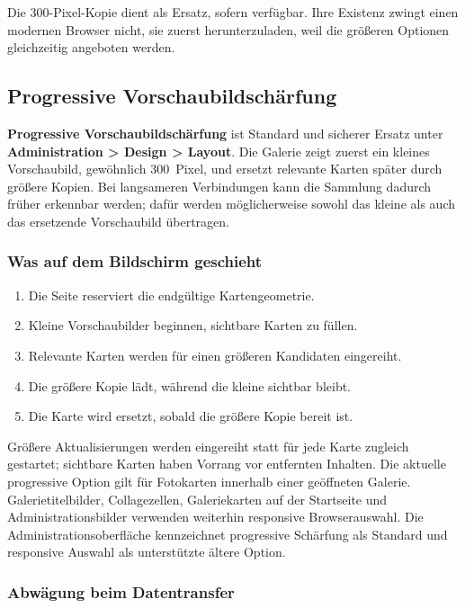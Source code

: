 \documentclass[11pt,a4paper]{article}
\newcommand{\ui}[1]{\textbf{#1}}
\begin{document}
Die 300-Pixel-Kopie dient als Ersatz, sofern verfügbar. Ihre Existenz zwingt
einen modernen Browser nicht, sie zuerst herunterzuladen, weil die größeren
Optionen gleichzeitig angeboten werden.

\subsection{Progressive Vorschaubildschärfung}

\ui{Progressive Vorschaubildschärfung} ist Standard und sicherer Ersatz unter
\ui{Administration > Design > Layout}. Die Galerie zeigt zuerst ein kleines
Vorschaubild, gewöhnlich 300~Pixel, und ersetzt relevante Karten später durch
größere Kopien. Bei langsameren Verbindungen kann die Sammlung dadurch früher
erkennbar werden; dafür werden möglicherweise sowohl das kleine als auch das
ersetzende Vorschaubild übertragen.

\subsubsection{Was auf dem Bildschirm geschieht}

\begin{enumerate}
  \item Die Seite reserviert die endgültige Kartengeometrie.
  \item Kleine Vorschaubilder beginnen, sichtbare Karten zu füllen.
  \item Relevante Karten werden für einen größeren Kandidaten eingereiht.
  \item Die größere Kopie lädt, während die kleine sichtbar bleibt.
  \item Die Karte wird ersetzt, sobald die größere Kopie bereit ist.
\end{enumerate}

Größere Aktualisierungen werden eingereiht statt für jede Karte zugleich
gestartet; sichtbare Karten haben Vorrang vor entfernten Inhalten. Die aktuelle
progressive Option gilt für Fotokarten innerhalb einer geöffneten Galerie.
Galerietitelbilder, Collagezellen, Galeriekarten auf der Startseite und
Administrationsbilder verwenden weiterhin responsive Browserauswahl. Die
Administrationsoberfläche kennzeichnet progressive Schärfung als Standard und
responsive Auswahl als unterstützte ältere Option.

\subsubsection{Abwägung beim Datentransfer}
\end{document}
